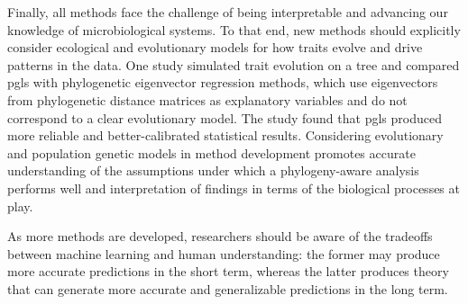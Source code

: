 Finally, all methods face the challenge of being interpretable and advancing our knowledge of microbiological systems. To that end, new methods should explicitly consider ecological and evolutionary models for how traits evolve and drive patterns in the data. One study simulated trait evolution on a tree and compared \gls{pgls} with phylogenetic eigenvector regression methods\cite{phylogenetic_eigenvector}, which use eigenvectors from phylogenetic distance matrices as explanatory variables and do not correspond to a clear evolutionary model. The study found that \gls{pgls} produced more reliable and better-calibrated statistical results\cite{phylogenetic_eigenvector}. Considering evolutionary and population genetic models in method development promotes accurate understanding of the assumptions under which a phylogeny-aware analysis performs well and interpretation of findings in terms of the biological processes at play\cite{comparative_methods_fix}. \par
As more methods are developed, researchers should be aware of the tradeoffs between machine learning and human understanding: the former may produce more accurate predictions in the short term, whereas the latter produces theory that can generate more accurate and generalizable predictions in the long term.\par
